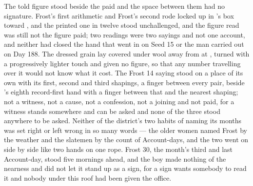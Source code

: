 The told figure stood beside the paid and the space between them had no signature. Frost's first arithmetic and Frost's second rode locked up  in 's box toward , and the printed one in twelve stood unchallenged, and the figure read was still not the figure paid; two readings were two sayings and not one account, and neither had closed the hand that went in on Seed 15 or the man carried out on Day 188. The dressed grain lay covered under wool away from  at , turned with a progressively lighter touch and given no figure, so that any number travelling over it would not know what it cost. The Frost 14 saying stood on a place of its own with its first, second and third shapings, a finger between every pair, beside 's eighth record-first hand with a finger between that and the nearest shaping; not a witness, not a cause, not a confession, not a joining and not paid, for a witness stands somewhere and can be asked and none of the three stood anywhere to be asked. Neither of the district's two habits of naming its months was set right or left wrong in so many words --- the older women named Frost by the weather and the slatemen by the count of Account-days, and the two went on side by side like two hands on one rope. Frost 30, the month's third and last Account-day, stood five mornings ahead, and the boy made nothing of the nearness and did not let it stand up as a sign, for a sign wants somebody to read it and nobody under this roof had been given the office.

\scenebreak

